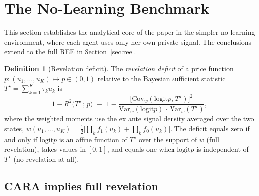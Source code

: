 \documentclass[12pt,letterpaper]{article}
\theoremstyle{definition}
\newtheorem{definition}{Definition}
\theoremstyle{remark}
\newcommand{\Var}{\mathrm{Var}}
\newcommand{\Cov}{\mathrm{Cov}}
\newcommand{\logit}{\mathrm{logit}}
\newcommand{\Tstar}{T^{\!\star}}
\newcommand{\1}{\mathbf{1}}
\begin{document}
\section{The No-Learning Benchmark}\label{sec:no-learning}

This section establishes the analytical core of the paper in the simpler
no-learning environment, where each agent uses only her own private signal.
The conclusions extend to the full REE in Section~\ref{sec:ree}.

\begin{definition}[Revelation deficit]\label{def:deficit}
The \emph{revelation deficit} of a price function
$p:(u_{1},\ldots,u_{K})\mapsto p\in(0,1)$ relative to the Bayesian
sufficient statistic $\Tstar=\sum_{k=1}^{K}\tau_{k}u_{k}$ is
\begin{equation}
   1 - R^{2}\bigl(\Tstar\,;\,p\bigr) \;\equiv\;
   1 - \frac{\bigl[\Cov_{w}(\logit p,\,\Tstar)\bigr]^{2}}
            {\Var_{w}(\logit p)\,\cdot\,\Var_{w}(\Tstar)},
\label{eq:deficit}
\end{equation}
where the weighted moments use the ex ante signal density averaged over
the two states,
$w(u_{1},\ldots,u_{K})=\tfrac12\bigl[\prod_{k}f_{1}(u_{k})
+\prod_{k}f_{0}(u_{k})\bigr]$. The deficit equals zero if and only if
$\logit p$ is an affine function of $\Tstar$ over the support of $w$
(full revelation), takes values in $[0,1]$, and equals one when $\logit p$
is independent of $\Tstar$ (no revelation at all).
\end{definition}

\subsection{CARA implies full revelation}
\end{document}
